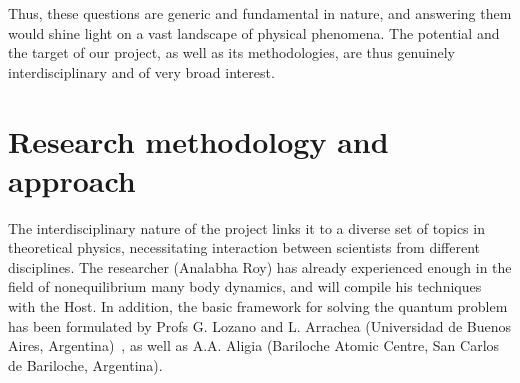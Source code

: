 \documentclass[a4paper,11pt,color]{article}
\begin{document}
Thus, these questions are generic and fundamental in nature, and answering them would shine light on a vast landscape of physical phenomena. The potential and the target of our project, as well as its methodologies, are thus genuinely interdisciplinary and of very broad interest.
 
\section{Research methodology and approach}
\label{sec:research_methodology}

The interdisciplinary nature of the project links it to  a diverse set of topics in theoretical physics, necessitating interaction between scientists from different disciplines. The researcher (Analabha Roy) has already experienced enough in the field of nonequilibrium many body dynamics, and will compile his techniques with the Host. In addition, the basic framework for solving the quantum problem has been formulated by Profs G. Lozano and L. Arrachea (Universidad de Buenos Aires, Argentina)~\cite{arrachea, arrachea2}, as well as A.A. Aligia (Bariloche Atomic Centre, San Carlos de Bariloche, Argentina). 
\end{document}

